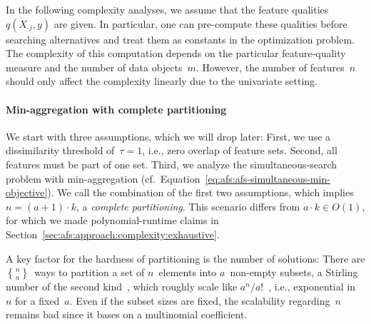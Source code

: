\documentclass{article}
\theoremstyle{definition}
\newcommand{\stirling}[2]{\genfrac\{\}{0pt}{}{#1}{#2}} %
\begin{document}
In the following complexity analyses, we assume that the feature qualities~$q(X_{\cdot{}j},y)$ are given.
In particular, one can pre-compute these qualities before searching alternatives and treat them as constants in the optimization problem.
The complexity of this computation depends on the particular feature-quality measure and the number of data objects~$m$.
However, the number of features~$n$ should only affect the complexity linearly due to the univariate setting.

\paragraph{Min-aggregation with complete partitioning}

We start with three assumptions, which we will drop later:
First, we use a dissimilarity threshold of~$\tau = 1$, i.e., zero overlap of feature sets.
Second, all features must be part of one set.
Third, we analyze the simultaneous-search problem with min-aggregation (cf.~Equation~\ref{eq:afs:afs-simultaneous-min-objective}).
We call the combination of the first two assumptions, which implies $n = (a+1) \cdot k$, a \emph{complete partitioning}.
This scenario differs from $a \cdot k \in O(1)$, for which we made polynomial-runtime claims in Section~\ref{sec:afs:approach:complexity:exhaustive}.

A key factor for the hardness of partitioning is the number of solutions:
There are $\stirling{n}{a}$~ways to partition a set of $n$~elements into $a$~non-empty subsets, a Stirling number of the second kind~\cite{graham1994concrete}, which roughly scale like $a^n / a!$~\cite{moser1958stirling}, i.e., exponential in~$n$ for a fixed~$a$.
Even if the subset sizes are fixed, the scalability regarding~$n$ remains bad since it bases on a multinomial coefficient.
\end{document}

